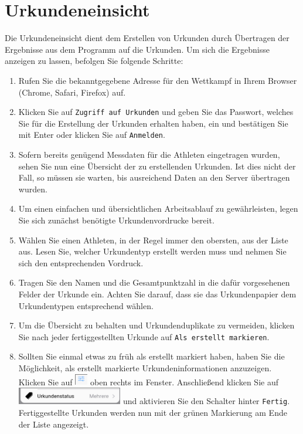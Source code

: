 \documentclass[11pt,a4paper,titlepage,german]{article}
\begin{document}
		\section{Urkundeneinsicht}
			Die Urkundeneinsicht dient dem Erstellen von Urkunden durch Übertragen der Ergebnisse aus dem Programm auf die Urkunden. Um sich die Ergebnisse anzeigen zu lassen, befolgen Sie folgende Schritte:
			\begin{enumerate}
				\item Rufen Sie die bekanntgegebene Adresse für den Wettkampf in Ihrem Browser (Chrome, Safari, Firefox) auf.
				
				\item Klicken Sie auf \texttt{Zugriff auf Urkunden} und geben Sie das Passwort, welches Sie für die Erstellung der Urkunden erhalten haben, ein und bestätigen Sie mit Enter oder klicken Sie auf \texttt{Anmelden}.
				
				\item Sofern bereits genügend Messdaten für die Athleten eingetragen wurden, sehen Sie nun eine Übersicht der zu erstellenden Urkunden. Ist dies nicht der Fall, so müssen sie warten, bis ausreichend Daten an den Server übertragen wurden.
				
				\item Um einen einfachen und übersichtlichen Arbeitsablauf zu gewährleisten, legen Sie sich zunächst benötigte Urkundenvordrucke bereit.
				
				\item Wählen Sie einen Athleten, in der Regel immer den obersten, aus der Liste aus. Lesen Sie, welcher Urkundentyp erstellt werden muss und nehmen Sie sich den entsprechenden Vordruck.
				
				\item Tragen Sie den Namen und die Gesamtpunktzahl in die dafür vorgesehenen Felder der Urkunde ein. Achten Sie darauf, dass sie das Urkundenpapier dem Urkundentypen entsprechend wählen.
				
				\item Um die Übersicht zu behalten und Urkundenduplikate zu vermeiden, klicken Sie nach jeder fertiggestellten Urkunde auf \texttt{Als erstellt markieren}.
				
				\item Sollten Sie einmal etwas zu früh als erstellt markiert haben, haben Sie die Möglichkeit, als erstellt markierte Urkundeninformationen anzuzeigen. Klicken Sie auf \includegraphics[height=0.5cm]{Settings} oben rechts im Fenster. Anschließend klicken Sie auf \includegraphics[height=0.75cm]{CertificateSettings} und aktivieren Sie den Schalter hinter \texttt{Fertig}. Fertiggestellte Urkunden werden nun mit der grünen Markierung am Ende der Liste angezeigt.
				
			\end{enumerate}
		
\end{document}
